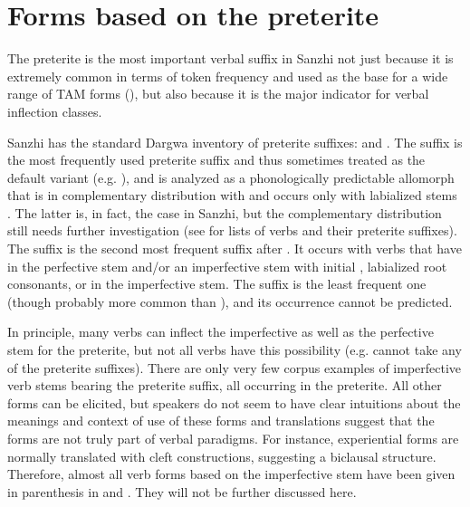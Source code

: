 
\section{Forms based on the preterite}
\label{sec:Forms based on the preterite}

The preterite is the most important verbal suffix in Sanzhi not just because it is extremely common in terms of token frequency and used as the base for a wide range of TAM forms (), but also because it is the major indicator for verbal inflection classes.

Sanzhi has the standard Dargwa inventory of preterite suffixes:  and . The suffix  is the most frequently used preterite suffix and thus sometimes treated as the default variant (e.g. ), and  is analyzed as a phonologically predictable allomorph that is in complementary distribution with  and occurs only with labialized stems \citep{BelyaevInPreparation}. The latter is, in fact, the case in Sanzhi, but the complementary distribution still needs further investigation (see  for lists of verbs and their preterite suffixes). The suffix  is the second most frequent suffix after . It occurs with verbs that have  in the perfective stem and/or an imperfective stem with initial , labialized root consonants, or  in the imperfective stem. The suffix  is the least frequent one (though probably more common than ), and its occurrence cannot be predicted.

In principle, many verbs can inflect the imperfective as well as the perfective stem for the preterite, but not all verbs have this possibility (e.g.   cannot take any of the preterite suffixes). There are only very few corpus examples of imperfective verb stems bearing the preterite suffix, all occurring in the preterite. All other forms can be elicited, but speakers do not seem to have clear intuitions about the meanings and context of use of these forms and translations suggest that the forms are not truly part of verbal paradigms. For instance, experiential forms are normally translated with cleft constructions, suggesting a biclausal structure.  Therefore, almost all verb forms based on the imperfective stem have been given in parenthesis in  and . They will not be further  discussed here.

